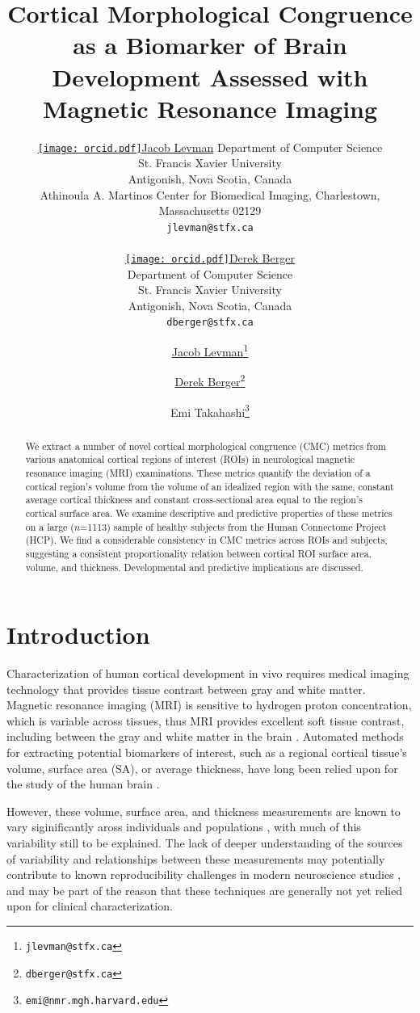 \documentclass{article}
\title{Cortical Morphological Congruence as a Biomarker of Brain Development Assessed with Magnetic Resonance Imaging}
\author{%
	\href{https://orcid.org/0000-0002-9604-3157}{\texttt{[image: orcid.pdf]}\hspace{1mm}Jacob Levman}
	Department of Computer Science\\
	St. Francis Xavier University\\
	Antigonish, Nova Scotia, Canada\\
	Athinoula A. Martinos Center for Biomedical Imaging, Charlestown, Massachusetts 02129\\
	\texttt{jlevman@stfx.ca} \\

	\And

	\href{https://orcid.org/0000-0003-4733-0624}{\texttt{[image: orcid.pdf]}\hspace{1mm}Derek Berger} \\
	Department of Computer Science\\
	St. Francis Xavier University\\
	Antigonish, Nova Scotia, Canada\\
	\texttt{dberger@stfx.ca} \\
}
\author[1,2,3]{%
	\href{https://orcid.org/0000-0002-9604-3157}{\usebox{\orcid}\hspace{1mm}Jacob Levman\thanks{\texttt{jlevman@stfx.ca}}}%
}
\author[1]{%
	\href{https://orcid.org/0000-0003-4733-0624}{\usebox{\orcid}\hspace{1mm}Derek Berger\thanks{\texttt{dberger@stfx.ca}}}%
}
\author[1,4]{%
	Emi Takahashi\thanks{\texttt{emi@nmr.mgh.harvard.edu}}%
}
\affil[1]{Athinoula A. Martinos Center for Biomedical Imaging, Charlestown, Massachusetts 02129}
\affil[2]{Department of Computer Science, St. Francis Xavier University,Antigonish, Nova Scotia}
\affil[3]{Nova Scotia Health Authority, Halifax, NS, Canada}
\affil[4]{Harvard Medical School, Department of Radiology, Boston, MA, USA.}
\begin{document}
\maketitle

\begin{abstract}
We extract a number of novel cortical morphological congruence (CMC) metrics
from various anatomical cortical regions of interest (ROIs) in neurological
magnetic resonance imaging (MRI) examinations. These metrics quantify the
deviation of a cortical region's volume from the volume of an idealized
region with the same, constant average cortical thickness and constant
cross-sectional area equal to the region's cortical surface area. We examine
descriptive and predictive properties of these metrics on a large
(\(n\)=1113) sample of healthy subjects from the Human Connectome Project
(HCP). We find a considerable consistency in CMC metrics across ROIs and
subjects, suggesting a consistent proportionality relation between cortical
ROI surface area, volume, and thickness. Developmental and predictive
implications are discussed.
\end{abstract}




\section{Introduction} \label{intro}

Characterization of human cortical development in vivo requires medical
imaging technology that provides tissue contrast between gray and white
matter. Magnetic resonance imaging (MRI) is sensitive to hydrogen proton
concentration, which is variable across tissues, thus MRI provides excellent
soft tissue contrast, including between the gray and white matter in the
brain \citep{duboisMRINeonatalBrain2021}. Automated methods for extracting
potential biomarkers of interest, such as a regional cortical tissue's
volume, surface area (SA), or average thickness, have long been relied upon for
the study of the human brain
\citep{fischlFreeSurfer2012,levmanPediatricStructuralMRI2017,levmanStructuralMagneticResonance2019a,mccannStructuralMagneticResonance2021}.

However, these volume, surface area, and thickness measurements are known to
vary siginificantly aross individuals and populations
\citep{fischlFreeSurfer2012,levmanPediatricStructuralMRI2017,levmanStructuralMagneticResonance2019a},
with much of this variability still to be explained. The lack of deeper
understanding of the sources of variability and relationships between these
measurements may potentially contribute to known reproducibility challenges
in modern neuroscience studies
\citep{martinezReproducibilityBraincognitionRelationships2015,marekReproducibleBrainwideAssociation2022},
and may be part of the reason that these techniques are generally not yet
relied upon for clinical characterization.
\end{document}
